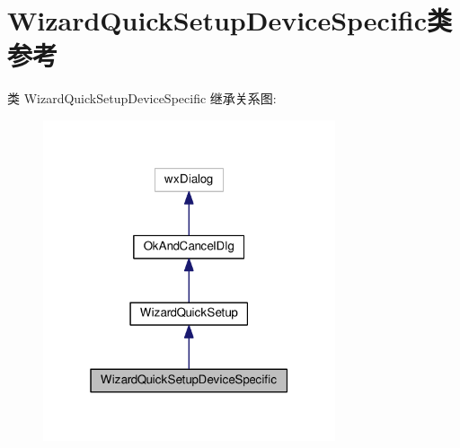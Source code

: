 \hypertarget{class_wizard_quick_setup_device_specific}{\section{Wizard\+Quick\+Setup\+Device\+Specific类 参考}
\label{class_wizard_quick_setup_device_specific}
}


类 Wizard\+Quick\+Setup\+Device\+Specific 继承关系图\+:
\nopagebreak
\begin{figure}[H]
\begin{center}
\leavevmode
\includegraphics[width=244pt]{class_wizard_quick_setup_device_specific__inherit__graph}
\end{center}
\end{figure}


